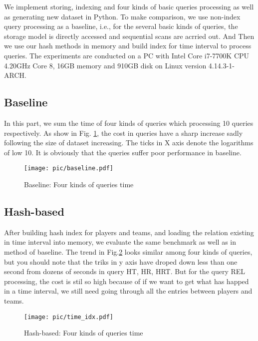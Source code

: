 We implement storing, indexing and four kinds of basic queries processing as well as generating new dataset in Python.
To make comparison, we use non-index query processing as a baseline, i.e., for the several basic kinds of queries, the 
storage model is directly accessed and sequential scans are acrried out. And Then we use our hash methods in  memory 
and build index for time interval to process queries. The experiments are conducted on a PC with Intel Core i7-7700K 
CPU 4.20GHz Core 8, 16GB memory and 910GB disk on Linux version 4.14.3-1-ARCH.

\subsection{Baseline}
In this part, we sum the time of four kinds of queries which processing 10 queries respectively. As show in Fig.
\ref{baseline}, the cost in queries have a sharp increase sadly following the size of dataset increasing. The 
ticks in X axis denote the logarithms of low 10. It is obviously that the queries suffer poor performance in 
baseline.

\begin{figure}[H]
	\centering
	\texttt{[image: pic/baseline.pdf]}\\
	\caption{Baseline: Four kinds of queries time}
	\label{baseline}
\end{figure}

\subsection{Hash-based}
After building hash index for players and teams, and loading the relation existing in time interval into memory, 
we evaluate the same benchmark as well as in method of baseline. The trend in Fig.\ref{time} looks similar among four 
kinds of queries, but you should note that the triks in y axis have droped down less than one second from dozens of 
seconds in query HT, HR, HRT. But for the query REL processing, the cost is stil so high because of if we want to get 
what has happed in a time interval, we still need going through all the entries between players and teams.

\begin{figure}[H]
	\centering
	\texttt{[image: pic/time\_idx.pdf]}\\
	\caption{Hash-based: Four kinds of queries time}
	\label{time}
\end{figure}

